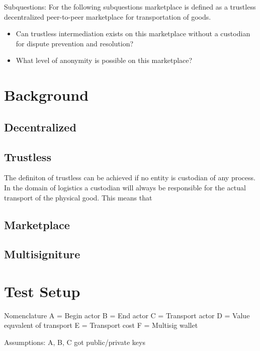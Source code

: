 \documentclass[Nomencl]{SelimArticle}
\begin{document}
\bigbreak
\noindent Subquestions:
\bigbreak
\noindent For the following subquestions marketplace is defined as a trustless decentralized peer-to-peer marketplace for transportation of goods.
\begin{itemize}
  \item Can trustless intermediation exists on this marketplace without a custodian for dispute prevention and resolution?
  \item What level of anonymity is possible on this marketplace?
\end{itemize}

\section{Background}

\subsection{Decentralized}

\subsection{Trustless}

The definiton of trustless can be achieved if no entity is custodian of any process. In the domain of logistics a custodian will always be responsible for the actual transport of the physical good. This means that

\subsection{Marketplace}

\subsection{Multisigniture}


\section{Test Setup}

Nomenclature
A = Begin actor
B = End actor
C = Transport actor
D = Value equvalent of transport
E = Transport cost
F = Multisig wallet

Assumptions:
A, B, C got public/private keys
\end{document}
